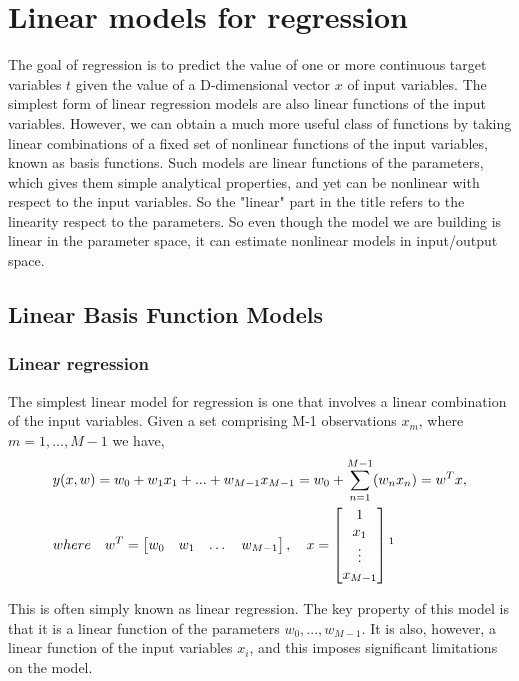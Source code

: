 \documentclass[../main.tex]{subfiles}
\begin{document}
\section{Linear models for regression}
The goal of regression is to predict the value of one or more continuous target variables $t$ given the value of
a D-dimensional vector $x$ of input variables. The simplest form of linear regression
models are also linear functions of the input variables. However, we can obtain a
much more useful class of functions by taking linear combinations of a fixed set of
nonlinear functions of the input variables, known as basis functions. Such models
are linear functions of the parameters, which gives them simple analytical properties,
and yet can be nonlinear with respect to the input variables. So the "linear" part in the title refers to the linearity respect to the parameters. So even though the model we are building is linear in the parameter space, it can estimate
nonlinear models in input/output space.

\subsection{Linear Basis Function Models}
\subsubsection{Linear regression}
The simplest linear model for regression is one that involves a linear combination of
the input variables. Given a set comprising M-1 observations ${x_m}$, where $m = 1, ..., M-1$ we have,
\begin{equation} \label{eqn_linear_basis}
    \begin{split}
         & y(x,w) = w_0+w_1x_1+...+w_{M-1}x_{M-1} = w_0+\sum_{n=1}^{M-1}(w_nx_n) = w^{T}x, \\
         &
        where \quad w^T=\begin{bmatrix}w_0 & w_1 & \dots & w_{M-1}\end{bmatrix},\quad
        x=\begin{bmatrix}1\\ x_1 \\ \vdots \\x_{M-1}\end{bmatrix}\footnotemark
    \end{split}
\end{equation}

This is often simply known as linear regression. The key
property of this model is that it is a linear function of the parameters $w_0, ..., w_{M-1}$. It is
also, however, a linear function of the input variables $x_i$, and this imposes significant limitations on the model.
\end{document}
